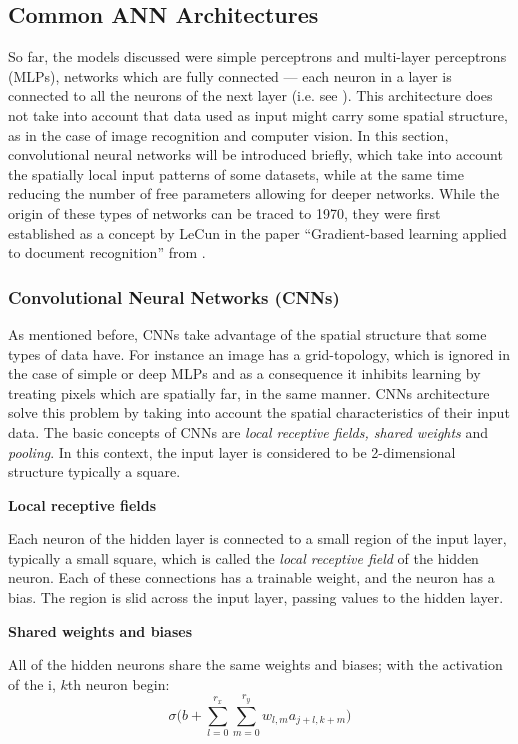 \clearpage
\subsection{Common ANN Architectures}

So far, the models discussed were simple perceptrons and multi-layer
perceptrons (MLPs), networks which are fully connected --- each neuron
in a layer is connected to all the neurons of the next layer (i.e. see
). This architecture does not take into
account that data used as input might carry some spatial structure, as
in the case of image recognition and computer vision.  In this
section, convolutional neural networks will be introduced briefly,
which take into account the spatially local input patterns of some
datasets, while at the same time reducing the number of free parameters
allowing for deeper networks. While the origin of these types of
networks can be traced to 1970, they were first established as a concept
by LeCun in the paper ``Gradient-based learning applied to document
recognition'' from \citet{article:lecun1998}.

\subsubsection{Convolutional Neural Networks (CNNs)}

As mentioned before, CNNs take advantage of the spatial structure that
some types of data have. For instance an image has a grid-topology,
which is ignored in the case of simple or deep MLPs and as a consequence it
inhibits learning by treating pixels which are spatially far, in the same
manner. CNNs architecture solve this problem by taking into account
the spatial characteristics of their input data. The basic concepts of
CNNs are \textit{local receptive fields, shared weights} and \textit{pooling}.
In this context, the input layer is considered to be 2-dimensional structure
typically a square.

\textbf{Local receptive fields}

Each neuron of the hidden layer is connected to a
small region of the input layer, typically a small square, which
is called the \textit{local receptive field} of the hidden neuron.
Each of these connections has a trainable weight, and the neuron has a bias.
The region is slid across the input layer, passing values to the hidden layer.

\textbf{Shared weights and biases}

All of the hidden neurons share the same weights and biases; with the activation
of the i, $k$th neuron begin:
\begin{equation}
  \label{eq:cnn_activation}
  \sigma \bigg(b + \sum_{l=0}^{r_x}\sum_{m=0}^{r_y}w_{l,m}a_{j+l,k+m}\bigg)
\end{equation}

